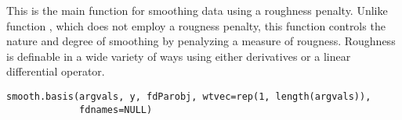 \begin{Description}\relax
This is the main function for smoothing data using a roughness
penalty.  Unlike function , which does not employ a
rougness penalty, this function controls the nature and degree of
smoothing by penalyzing a measure of rougness.  Roughness is definable
in a wide variety of ways using either derivatives or a linear
differential operator.
\end{Description}
\begin{Usage}
\begin{verbatim}
smooth.basis(argvals, y, fdParobj, wtvec=rep(1, length(argvals)),
             fdnames=NULL)
\end{verbatim}
\end{Usage}
